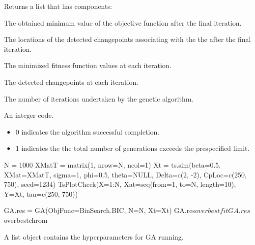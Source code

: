 \documentclass[a4paper]{book}
\begin{document}
%
\begin{Value}
Returns a list that has components:
\begin{ldescription}
\item[\code{overbestfit}] The obtained minimum value of the objective function after
the final iteration.
\item[\code{overbestchrom}] The locations of the detected changepoints associating
with the  the after the final iteration.
\item[\code{bestfit}] The minimized fitness function values at each iteration.
\item[\code{bestchrom}] The detected changepoints at each iteration.
\item[\code{count}] The number of iterations undertaken by the genetic algorithm.
\item[\code{convg}] An integer code.
\begin{itemize}

\item{} 0 indicates the algorithm successful completion.
\item{} 1 indicates the the total number of generations exceeds the
prespecified  limit.

\end{itemize}


\end{ldescription}
\end{Value}
%
\begin{Examples}
\begin{ExampleCode}
N = 1000
XMatT = matrix(1, nrow=N, ncol=1)
Xt = ts.sim(beta=0.5, XMat=XMatT, sigma=1, phi=0.5, theta=NULL,
            Delta=c(2, -2), CpLoc=c(250, 750), seed=1234)
TsPlotCheck(X=1:N, Xat=seq(from=1, to=N, length=10), Y=Xt, tau=c(250, 750))

GA.res = GA(ObjFunc=BinSearch.BIC, N=N, Xt=Xt)
GA.res$overbestfit
GA.res$overbestchrom
\end{ExampleCode}
\end{Examples}
%
\begin{Description}
A list object contains the hyperparameters for GA running.
\end{Description}
%
\end{document}
